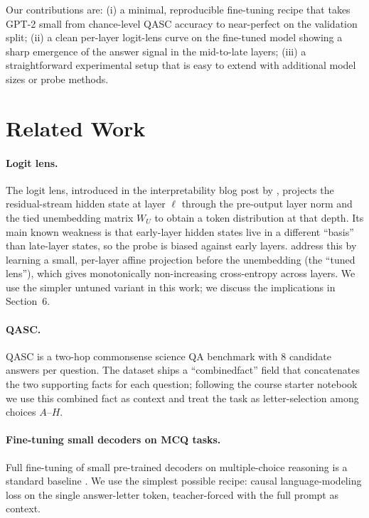 \documentclass[11pt]{article}
\begin{document}
Our contributions are: (i) a minimal, reproducible fine-tuning recipe that
takes GPT-2 small from chance-level QASC accuracy to near-perfect on the
validation split; (ii) a clean per-layer logit-lens curve on the fine-tuned
model showing a sharp emergence of the answer signal in the mid-to-late layers;
(iii) a straightforward experimental setup that is easy to extend with
additional model sizes or probe methods.

\section{Related Work}

\paragraph{Logit lens.} The logit lens, introduced in the interpretability
blog post by \citet{nostalgebraist2020}, projects the residual-stream hidden
state at layer $\ell$ through the pre-output layer norm and the tied
unembedding matrix $W_U$ to obtain a token distribution at that depth. Its
main known weakness is that early-layer hidden states live in a different
``basis'' than late-layer states, so the probe is biased against early layers.
\citet{belrose2023tunedlens} address this by learning a small, per-layer affine
projection before the unembedding (the ``tuned lens''), which gives
monotonically non-increasing cross-entropy across layers. We use the simpler
untuned variant in this work; we discuss the implications in Section~6.

\paragraph{QASC.} QASC \citep{khot2020qasc} is a two-hop commonsense science
QA benchmark with 8 candidate answers per question. The dataset ships a
``combinedfact'' field that concatenates the two supporting facts for each
question; following the course starter notebook we use this combined fact as
context and treat the task as letter-selection among choices $A$--$H$.

\paragraph{Fine-tuning small decoders on MCQ tasks.} Full fine-tuning of
small pre-trained decoders on multiple-choice reasoning is a standard baseline
\citep{radford2019gpt2,wolf2020transformers}. We use the simplest possible
recipe: causal language-modeling loss on the single answer-letter token,
teacher-forced with the full prompt as context.
\end{document}
